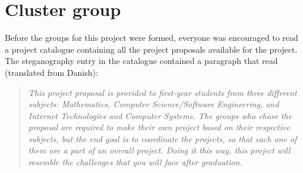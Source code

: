\section*{Cluster group}
Before the groups for this project were formed, everyone was encouraged to read a project catalogue containing all the project proposals available for the project.
The steganography entry in the catalogue contained a paragraph that read (translated from Danish):
\begin{quote}\textit{This project proposal is provided to first-year students from three different subjects: Mathematics, Computer Science/Software Engineering, and Internet Technologies and Computer Systems.
The groups who chose the proposal are required to make their own project based on their respective subjects, but the end goal is to coordinate the projects, so that each one of them are a part of an overall project.
Doing it this way, this project will resemble the challenges that you will face after graduation.}\end{quote}

